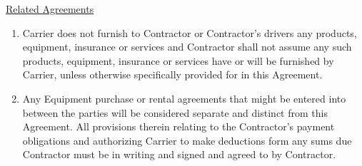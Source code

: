 \underline{Related Agreements}
\begin{enumerate}
    \item Carrier does not furnish to Contractor or Contractor's drivers
    any products, equipment, insurance or services and Contractor shall not
    assume any such products, equipment, insurance or services have or will
    be furnished by Carrier, unless otherwise specifically provided for in
    this Agreement.

    \item Any Equipment purchase or rental agreements that might be entered
    into between the parties will be considered separate and distinct from
    this Agreement. All provisions therein relating to the Contractor's
    payment obligations and authorizing Carrier to make deductions form any
    sums due Contractor must be in writing and signed and agreed to by
    Contractor.
\end{enumerate}